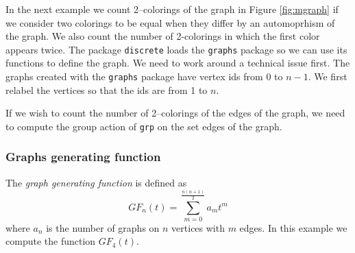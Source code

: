 \documentclass[11pt]{article}
\newcommand{\command}[1]{\texttt{#1}}
\newcommand{\DEF}[1]{{\em #1}}
\begin{document}
In the next example we count 2--colorings of the graph in
Figure \ref{fig:mgraph} if we consider two colorings to be equal when
they differ by an automoprhism of the graph. We also count the number
of 2-colorings in which the first color appears twice. The package
\command{discrete} loads the \command{graphs} package so we can use
its functions to define the graph. We need to work around a technical
issue first. The graphs created with the \command{graphs} package have
vertex ids from 0 to $n-1$. We first relabel the vertices so that the
ids are from 1 to $n$.

%
If we wish to count the number of 2--colorings of the edges of the graph,
we need to compute the group action of \command{grp} on the set 
edges of the graph.


\subsubsection{Graphs generating function}

The \DEF{graph generating function} is defined as
$$
GF_n(t) = \sum_{m=0}^{\frac{n(n+1)}{2}} a_mt^m
$$
where $a_n$ is the number of graphs on $n$ vertices with $m$ edges.
In this example we compute the function $GF_4(t)$.
\end{document}
